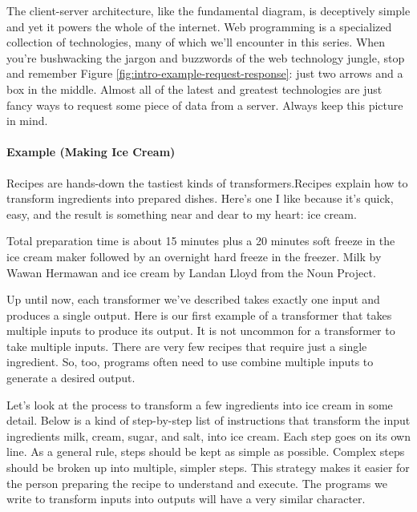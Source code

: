The client-server architecture, like the fundamental diagram, is deceptively simple and yet it powers the whole of the internet. Web programming is a specialized collection of technologies, many of which we'll encounter in this series. When you're bushwacking the jargon and buzzwords of the web technology jungle, stop and remember Figure \ref{fig:intro-example-request-response}: just two arrows and a box in the middle. Almost all of the latest and greatest technologies are just fancy ways to request some piece of data from a server. Always keep this picture in mind.

\paragraph{Example (Making Ice Cream)} Recipes are hands-down the tastiest kinds of transformers.Recipes explain how to transform ingredients into prepared dishes. Here's one I like because it's quick, easy, and the result is something near and dear to my heart: ice cream.

\begin{marginfigure}
  
  \caption{\label{fig:intro-example-ice-cream} Total preparation time is about 15 minutes plus a 20 minutes soft freeze in the ice cream maker followed by an overnight hard freeze in the freezer.\vskip 5pt Milk by Wawan Hermawan and ice cream by Landan Lloyd from the Noun Project.}
\end{marginfigure}

Up until now, each transformer we've described takes exactly one input and produces a single output. Here is our first example of a transformer that takes multiple inputs to produce its output. It is not uncommon for a transformer to take multiple inputs. There are very few recipes that require just a single ingredient. So, too, programs often need to use combine multiple inputs to generate a desired output.

Let's look at the process to transform a few ingredients into ice cream in some detail. Below is a kind of step-by-step list of instructions that transform the input ingredients milk, cream, sugar, and salt, into ice cream. Each step goes on its own line. As a general rule, steps should be kept as simple as possible. Complex steps should be broken up into multiple, simpler steps. This strategy makes it easier for the person preparing the recipe to understand and execute. The programs we write to transform inputs into outputs will have a very similar character.

